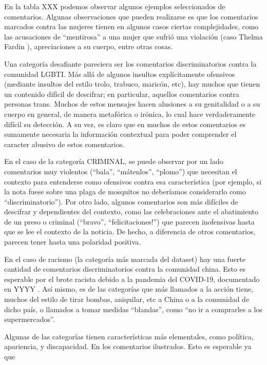 En la tabla XXX podemos observar algunos ejemplos seleccionados de comentarios. Algunas observaciones que pueden realizarse es que los comentarios marcados contra las mujeres tienen en algunos casos ciertas complejidades, como las acusaciones de ``mentirosa'' a una mujer que sufrió una violación (caso Thelma Fardin ), apreciaciones a su cuerpo, entre otras cosas.

Una categoría desafiante pareciera ser los comentarios discriminatorios contra la comunidad LGBTI. Más allá de algunos insultos explícitamente ofensivos (mediante insultos del estilo trolo, trabuco, maricón, etc), hay muchos que tienen un contenido difícil de descifrar; en particular, aquellos comentarios contra personas trans. Muchos de estos mensajes hacen alusiones a su genitalidad o a su cuerpo en general, de manera metafórica o irónica, lo cual hace verdaderamente difícil su detección. A su vez, es claro que en muchos de estos comentarios es sumamente necesaria la información contextual para poder comprender el caracter abusivo de estos comentarios.

En el caso de la categoría CRIMINAL, se puede observar por un lado comentarios muy violentos (``bala'', ``mátenlos'', ``plomo'') que necesitan el contexto para entenderse como ofensivos contra esa característica (por ejemplo, si la nota fuese sobre una plaga de mosquitos no deberíamos considerarlo como ``discriminatorio''). Por otro lado, algunos comentarios son más difíciles de descifrar y dependientes del contexto, como las celebraciones ante el abatimiento de un preso o criminal (``bravo'', ``felicitaciones!'') que parecen inofensivas hasta que se lee el contexto de la noticia. De hecho, a diferencia de otros comentarios, parecen tener hasta una polaridad positiva.

En el caso de racismo (la categoría más marcada del dataset) hay una fuerte cantidad de comentarios discriminatorios contra la comunidad china. Esto es esperable por el brote racista debido a la pandemia del COVID-19, documentado en YYYY . Así mismo, es de las categorías que más llamados a la acción tiene, muchos del estilo de tirar bombas, aniquilar, etc a China o a la comunidad de dicho país, o llamados a tomar medidas ``blandas'', como ``no ir a comprarles a los supermercados''.

Algunas de las categorías tienen características más elementales, como política, apariencia, y discapacidad. En los comentarios ilustrados. Esto es esperable ya que


